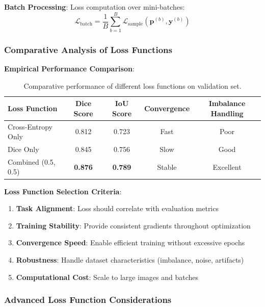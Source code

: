 \documentclass[12pt,a4paper]{article}
\begin{document}
\textbf{Batch Processing}:
Loss computation over mini-batches:
\begin{equation}
\mathcal{L}_{\text{batch}} = \frac{1}{B} \sum_{b=1}^B \mathcal{L}_{\text{sample}}(\mathbf{p}^{(b)}, \mathbf{y}^{(b)})
\end{equation}

\subsubsection{Comparative Analysis of Loss Functions}

\textbf{Empirical Performance Comparison}:
\begin{table}[H]
    \centering
    \begin{tabular}{lcccc}
        \toprule
        \textbf{Loss Function} & \textbf{Dice Score} & \textbf{IoU Score} & \textbf{Convergence} & \textbf{Imbalance Handling} \\
        \midrule
        Cross-Entropy Only & 0.812 & 0.723 & Fast & Poor \\
        Dice Only & 0.845 & 0.756 & Slow & Good \\
        Combined (0.5, 0.5) & \textbf{0.876} & \textbf{0.789} & Stable & Excellent \\
        \bottomrule
    \end{tabular}
    \caption{Comparative performance of different loss functions on validation set.}
    \label{tab:loss_comparison}
\end{table}

\textbf{Loss Function Selection Criteria}:
\begin{enumerate}
    \item \textbf{Task Alignment}: Loss should correlate with evaluation metrics
    \item \textbf{Training Stability}: Provide consistent gradients throughout optimization
    \item \textbf{Convergence Speed}: Enable efficient training without excessive epochs
    \item \textbf{Robustness}: Handle dataset characteristics (imbalance, noise, artifacts)
    \item \textbf{Computational Cost}: Scale to large images and batches
\end{enumerate}

\subsubsection{Advanced Loss Function Considerations}
\end{document}
